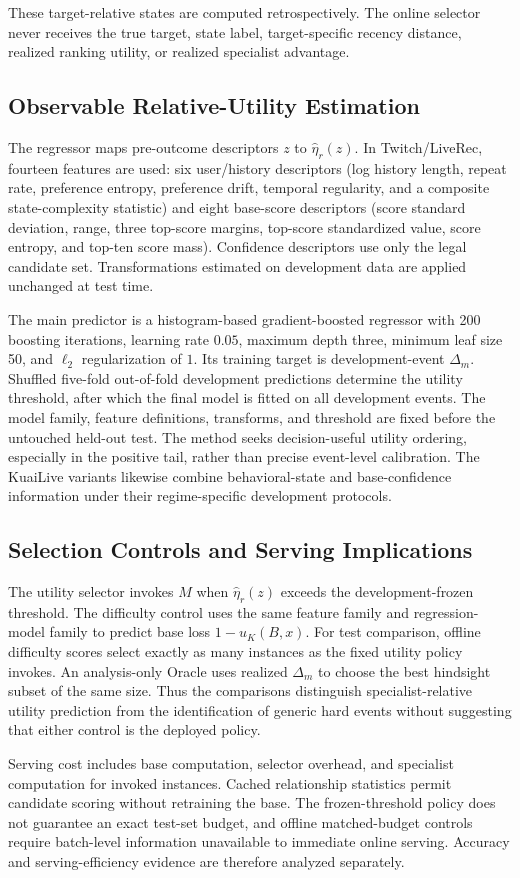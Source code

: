 These target-relative states are computed retrospectively. The online selector never receives the true target, state label, target-specific recency distance, realized ranking utility, or realized specialist advantage.

\subsection{Observable Relative-Utility Estimation}
\label{sec:estimator}

The regressor maps pre-outcome descriptors $z$ to $\hat{\eta}_r(z)$. In Twitch/LiveRec, fourteen features are used: six user/history descriptors (log history length, repeat rate, preference entropy, preference drift, temporal regularity, and a composite state-complexity statistic) and eight base-score descriptors (score standard deviation, range, three top-score margins, top-score standardized value, score entropy, and top-ten score mass). Confidence descriptors use only the legal candidate set. Transformations estimated on development data are applied unchanged at test time.

The main predictor is a histogram-based gradient-boosted regressor with 200 boosting iterations, learning rate $0.05$, maximum depth three, minimum leaf size 50, and $\ell_2$ regularization of $1$. Its training target is development-event $\Delta_m$. Shuffled five-fold out-of-fold development predictions determine the utility threshold, after which the final model is fitted on all development events. The model family, feature definitions, transforms, and threshold are fixed before the untouched held-out test. The method seeks decision-useful utility ordering, especially in the positive tail, rather than precise event-level calibration. The KuaiLive variants likewise combine behavioral-state and base-confidence information under their regime-specific development protocols.

\subsection{Selection Controls and Serving Implications}
\label{sec:controls}

The utility selector invokes $M$ when $\hat{\eta}_r(z)$ exceeds the development-frozen threshold. The difficulty control uses the same feature family and regression-model family to predict base loss $1-u_K(B,x)$. For test comparison, offline difficulty scores select exactly as many instances as the fixed utility policy invokes. An analysis-only Oracle uses realized $\Delta_m$ to choose the best hindsight subset of the same size. Thus the comparisons distinguish specialist-relative utility prediction from the identification of generic hard events without suggesting that either control is the deployed policy.

Serving cost includes base computation, selector overhead, and specialist computation for invoked instances. Cached relationship statistics permit candidate scoring without retraining the base. The frozen-threshold policy does not guarantee an exact test-set budget, and offline matched-budget controls require batch-level information unavailable to immediate online serving. Accuracy and serving-efficiency evidence are therefore analyzed separately.
